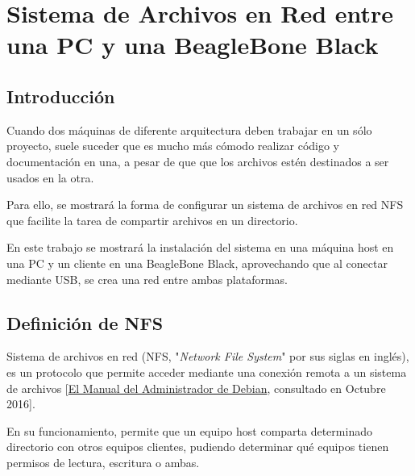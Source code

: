 
\chapter{Sistema de Archivos en Red entre una PC y una BeagleBone Black}\label{Anx:nfs}
\section{Introducción}
Cuando dos máquinas de diferente arquitectura deben trabajar en un sólo proyecto, suele suceder que es mucho más cómodo realizar código y documentación en una, a pesar de que que los archivos estén destinados a ser usados en la otra.

Para ello, se mostrará la forma de configurar un sistema de archivos en red NFS que facilite la tarea de compartir archivos en un directorio.

En este trabajo se mostrará la instalación del sistema en una máquina host en una PC y un cliente en una BeagleBone Black, aprovechando que al conectar mediante USB, se crea una red entre ambas plataformas.


\section{Definición de NFS}
Sistema de archivos en red (NFS, "\textit{Network File System}" por sus siglas en inglés), es un protocolo que permite acceder mediante una conexión remota a un sistema de archivos [\href{https://debian-handbook.info/browse/es-ES/stable/sect.nfs-file-server.html}{El Manual del Administrador de Debian}\footnotemark, consultado en Octubre 2016].


En su funcionamiento, permite que un equipo host comparta determinado directorio con otros equipos clientes, pudiendo determinar qué equipos tienen permisos de lectura, escritura o ambas.


